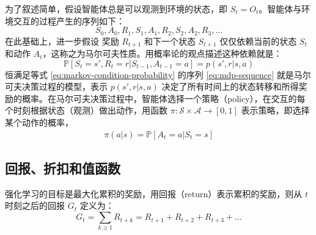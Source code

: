 为了叙述简单，假设智能体总是可以观测到环境的状态，即 $S_t = O_t$。智能体与环境交互的过程产生的序列如下：
\begin{equation}
    S_0, A_0, R_1, S_1, A_1, R_2, S_2, A_2, R_3,\dots
    \label{eq:mdp-sequence}
\end{equation}
在此基础上，进一步假设 奖励 $R_{t+1}$ 和下一个状态 $S_{t+1}$ 仅仅依赖当前的状态 $S_t$ 和动作 $A_t$，这称之为马尔可夫性质。用概率论的观点描述这种依赖就是：
\begin{equation}
    \mathbb{P}[S_t = s', R_t = r| S_{t-1}, A_{t-1} = a] = p(s', r | s, a)
    \label{eq:markov-condition-probability}
\end{equation}
恒满足等式 \ref{eq:markov-condition-probability} 的序列 \ref{eq:mdp-sequence} 就是马尔可夫决策过程的模型，表示 $p(s', r | s, a)$ 决定了所有时间上的状态转移和所得奖励的概率。在马尔可夫决策过程中，智能体选择一个策略（policy），在交互的每个时刻根据状态（观测）做出动作，用函数 $\pi : \mathcal{S} \times \mathcal{A} \rightarrow [0, 1]$ 表示策略，即选择某个动作的概率，
\begin{equation}
        \begin{split}
            \pi(a|s) = \mathbb{P} [A_t = a | S_t = s]
        \end{split}
\end{equation}



\subsection{回报、折扣和值函数}
强化学习的目标是最大化累积的奖励，用回报（return）表示累积的奖励，则从 $t$ 时刻之后的回报 $G_t$ 定义为：
\begin{equation}
    G_t = \sum_{k \geq 1} R_{t+k} = R_{t+1} + R_{t+2} + R_{t+3} + \dots
\end{equation}


